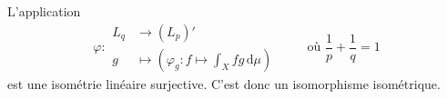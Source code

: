 
  \begin{application}
    L'application
    \[
    \varphi :
    \begin{array}{ll}
      L_q &\rightarrow (L_p)' \\
      g &\mapsto \left( \varphi_g : f \mapsto \int_X f g \, \mathrm{d}\mu \right)
    \end{array}
    \qquad \text{ où } \frac{1}{p} + \frac{1}{q} = 1
    \]
    est une isométrie linéaire surjective. C'est donc un isomorphisme isométrique.
  \end{application}

